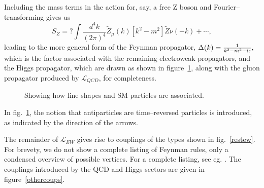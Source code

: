 Including the mass terms in the action for, say, a free Z boson and Fourier--transforming gives us
\[S_Z=?\int\frac{d^4k}{(2\pi)^4}\tilde Z_\mu(k)[k^2-m^2]\tilde Z\nu(-k) +\cdots,\]
leading to the more general form of the Feynman propagator,
\(\Delta(k)=\frac{1}{k^2-m^2-i\epsilon},\)
which is the factor associated with the remaining electroweak propagators, and the Higgs propagator, which are drawn as shown in figure~\ref{ewprops}, along with the gluon propagator produced by $\mathcal{L}_\textit{QCD}$, for completeness.

\begin{figure}[hbtp]
\begin{minipage}[b]{.69\textwidth}
\centering\footnotesize
{}
\hspace{5em}
\vspace{1em}

\hspace{5em}
\end{minipage}
\hfill
\begin{minipage}[b]{.3\textwidth}
\caption{Showing how line shapes and SM particles are associated.}\label{ewprops}
\end{minipage}
\end{figure}

In fig.~\ref{ewprops}, the notion that antiparticles are time--reversed particles is introduced, as indicated by the direction of the arrows.

The remainder of $\mathcal{L}_\textit{EW}$ gives rise to couplings of the types shown in fig.~\ref{restew}. For brevety, we do not show a complete listing of Feynman rules, only a condensed overview of possible vertices. For a complete listing, see eg. \cite{allfeynrules}. The couplings introduced by the QCD and Higgs sectors are given in figure~\ref{othercoups}.

